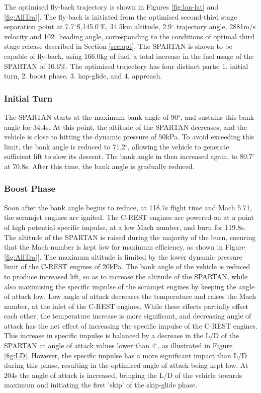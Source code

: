 The optimised fly-back trajectory is shown in Figures \ref{fig:lon-lat} and \ref{fig:AllTraj}.
The fly-back is initiated from the optimised second-third stage separation point at 7.7$^\circ$S,145.0$^\circ$E, 34.5km altitude, 2.9$^\circ$ trajectory angle, 2881m/s velocity and 102$^\circ$ heading angle, corresponding to the conditions of optimal third stage release described in Section \ref*{sec:opt}. 
The SPARTAN is shown to be capable of fly-back, using 166.0kg of fuel, a total increase in the fuel usage of the SPARTAN of 10.6\%.
The optimised trajectory has four distinct parts; 1. initial turn, 2. boost phase, 3. hop-glide, and 4. approach. 

\subsubsection{ Initial Turn}
The SPARTAN starts at the maximum bank angle of 90$^\circ$, and sustains this bank angle for 34.4s. At this point, the altitude of the SPARTAN decreases, and the vehicle is close to hitting the dynamic pressure of 50kPa. To avoid exceeding this limit, the bank angle is reduced to 71.2$^\circ$, allowing the vehicle to generate sufficient lift to slow its descent. The bank angle in then increased again, to 80.7$^\circ$ at 70.8s. After this time, the bank angle is gradually reduced. 

\subsubsection{ Boost Phase}
Soon after the bank angle begins to reduce, at 118.7s flight time and Mach 5.71, the scramjet engines are ignited. The C-REST engines are powered-on at a point of high potential specific impulse, at a low Mach number, and burn for 119.8s. The altitude of the SPARTAN is raised during the majority of the burn, ensuring that the Mach number is kept low for maximum efficiency\cite{Preller2017}, as shown in Figure \ref{fig:AllTraj}. The maximum altitude is limited by the lower dynamic pressure limit of the C-REST engines of 20kPa. The bank angle of the vehicle is reduced to produce increased lift, so as to increase the altitude of the SPARTAN, while also maximising the specific impulse of the scramjet engines by keeping the angle of attack low. Low angle of attack decreases the temperature and raises the Mach number, at the inlet of the C-REST engines. While these effects partially offset each other\cite{Preller2017}, the temperature increase is more significant, and decreasing angle of attack has the net effect of increasing the specific impulse of the C-REST engines. This increase in specific impulse is balanced by a decrease in the L/D of the SPARTAN at angle of attack values lower than 4$^\circ$, as illustrated in Figure \ref{fig:LD}. However, the specific impulse has a more significant impact than L/D during this phase, resulting in the optimised angle of attack being kept low. At 204s the angle of attack is increased, bringing the L/D of the vehicle towards maximum and initiating the first 'skip' of the skip-glide phase.  


